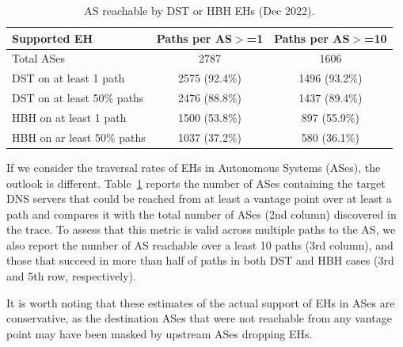 \documentclass[conference]{IEEEtran}
\begin{document}
\begin{table}
\caption{AS reachable by DST or HBH EHs (Dec 2022).}
\begin{tabular}{l|c|c}
Supported EH                & Paths per AS$>$=1 & Paths per AS$>$=10 \\
\hline \hline
Total  ASes                 & 2787              & 1606 \\
\hline
DST on at least 1 path      & 2575 (92.4\%)     & 1496 (93.2\%)      \\
DST on at least 50\% paths  & 2476 (88.8\%)     & 1437 (89.4\%)      \\ \hline
HBH on at least 1 path      & 1500 (53.8\%)      & 897 (55.9\%)      \\
HBH on ar least 50\% paths  & 1037 (37.2\%)      & 580 (36.1\%)  
\end{tabular}
\label{tbl:as_pathspider}
\end{table}

If we consider the traversal rates of EHs in Autonomous Systems (ASes), the
outlook is different.  Table~\ref{tbl:as_pathspider} reports the  number of
ASes containing the target DNS servers that could be reached from at least a
vantage point over at least a path and compares it with the total number of
ASes (2nd column) discovered in the trace. To assess that this metric is valid
across multiple paths to the AS, we also report the number of AS reachable over
a least 10 paths (3rd column), and those that succeed in more than half of
paths in both DST and HBH cases (3rd and 5th row, respectively).



It is worth noting that these estimates of the actual support of EHs in ASes
are conservative, as the destination ASes that were not reachable from any
vantage point may have been masked by upstream ASes dropping EHs.

\end{document}

